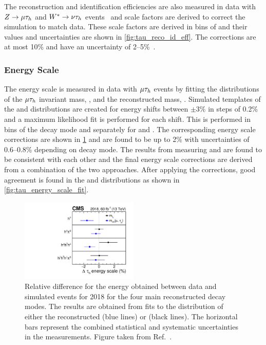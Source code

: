 \begin{figure}
\end{figure}

The \tauh reconstruction and identification efficiencies are also measured in data with $Z\to\mu\tau_h$ and $W^*\to\nu\tau_h$ events~\cite{CMS:2022prd} and scale factors are derived to correct the simulation to match data. These scale factors are derived in bins of \pt and their values and uncertainties are shown in \cref{fig:tau_reco_id_eff}. The corrections are at most 10\% and have an uncertainty of 2--5\%~\cite{CMS:2022prd}.

\subsubsection{\tauh Energy Scale}\label{sec:tau_energy_scale}

The \tauh energy scale is measured in data with $\mu\tau_h$ events by fitting the distributions of the $\mu\tau_h$ invariant mass, \mvis, and the reconstructed \tauh mass, \mtauh. Simulated templates of the \mvis and \mtauh distributions are created for \tauh energy shifts between $\pm3\%$ in steps of 0.2\% and a maximum likelihood fit is performed for each shift. This is performed in bins of the \tauh decay mode and separately for \mvis and \mtauh. The corresponding energy scale corrections are shown in \cref{fig:tau_energy_scale} and are found to be up to 2\% with uncertainties of 0.6--0.8\% depending on decay mode. The results from measuring \mvis and \mtauh are found to be consistent with each other and the final energy scale corrections are derived from a combination of the two approaches. After applying the corrections, good agreement is found in the \mvis and \mtauh distributions as shown in \cref{fig:tau_energy_scale_fit}.

\begin{figure}
  \centering
  \includegraphics[width=0.5\textwidth]{Figures/Detector/CMS/tau_energy_scale.pdf}
  \caption[\tauh Energy Scale Corrections]{Relative difference for the \tauh energy obtained between data and simulated events for 2018 for the four main reconstructed \tauh decay modes. The results are obtained from fits to the distribution of either the reconstructed \mvis (blue lines) or \mtauh (black lines). The horizontal bars represent the combined statistical and systematic uncertainties in the measurements. Figure taken from Ref.~\cite{CMS:2022prd}.}\label{fig:tau_energy_scale}
\end{figure}

